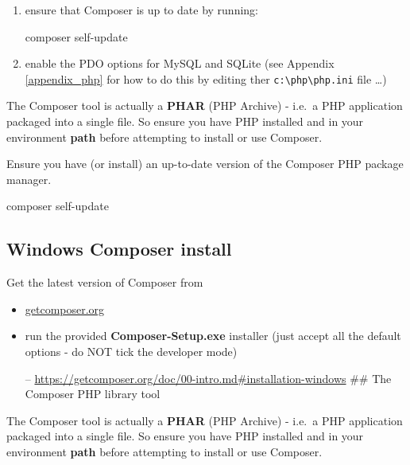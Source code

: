 \documentclass[a4paperpaper,openright]{book}
\newenvironment{Shaded}{}{}
\newcommand{\ExtensionTok}[1]{#1}
\newcommand{\NormalTok}[1]{#1}
\begin{document}
\begin{enumerate}
\def\labelenumi{\arabic{enumi}.}
\item
  ensure that Composer is up to date by running:

\begin{Shaded}
\begin{Highlighting}[]
    \ExtensionTok{composer}\NormalTok{ self-update}
\end{Highlighting}
\end{Shaded}
\item
  enable the PDO options for MySQL and SQLite (see Appendix
  \ref{appendix_php} for how to do this by editing ther
  \texttt{c:\textbackslash{}php\textbackslash{}php.ini} file \ldots{})
\end{enumerate}

The Composer tool is actually a \textbf{PHAR} (PHP Archive) - i.e.~a PHP
application packaged into a single file. So ensure you have PHP
installed and in your environment \textbf{path} before attempting to
install or use Composer.

Ensure you have (or install) an up-to-date version of the Composer PHP
package manager.

\begin{Shaded}
\begin{Highlighting}[]
    \ExtensionTok{composer}\NormalTok{ self-update}
\end{Highlighting}
\end{Shaded}

\hypertarget{windows-composer-install}{%
\subsection{Windows Composer install}\label{windows-composer-install}}

Get the latest version of Composer from

\begin{itemize}
\item
  \href{https://getcomposer.org/}{getcomposer.org}
\item
  run the provided \textbf{Composer-Setup.exe} installer (just accept
  all the default options - do NOT tick the developer mode)

  -- \url{https://getcomposer.org/doc/00-intro.md\#installation-windows}
  \#\# The Composer PHP library tool
\end{itemize}

The Composer tool is actually a \textbf{PHAR} (PHP Archive) - i.e.~a PHP
application packaged into a single file. So ensure you have PHP
installed and in your environment \textbf{path} before attempting to
install or use Composer.
\end{document}
